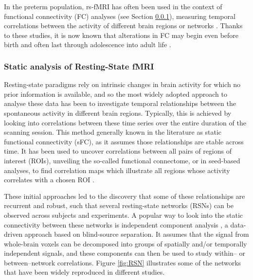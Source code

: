 In the preterm population, rs-fMRI has often been used in the context of functional connectivity (FC) analyses (see Section \ref{sub:static_rsfmri}), measuring temporal correlations between the activity of different brain regions or networks \citep{Lordier2019}. Thanks to these studies, it is now known that alterations in FC may begin even before birth \citep{Thomason2017} and often last through adolescence \citep{Wehrle2018} into adult life \citep{Papini2016}. 

\subsubsection{Static analysis of Resting-State fMRI} \label{sub:static_rsfmri}

Resting-state paradigms rely on intrinsic changes in brain activity for which no prior information is available, and so the most widely adopted approach to analyse these data has been to investigate temporal relationships between the spontaneous activity in different brain regions. Typically, this is achieved by looking into correlations between these time series over the entire duration of the scanning session. This method generally known in the literature as static functional connectivity (sFC), as it assumes those relationships are stable across time. It has been used to uncover correlations between all pairs of regions of interest (ROIs), unveiling the so-called functional connectome, or in seed-based analyses, to find correlation maps which illustrate all regions whose activity correlates with a chosen ROI \citep{Lee2013, Smitha2017}. 

These initial approaches led to the discovery that some of these relationships are recurrent and robust, such that several resting-state networks (RSNs) can be observed across subjects and experiments. A popular way to look into the static connectivity between these networks is independent component analysis \citep{McKeown1998, Calhoun2001}, a data-driven approach based on blind-source separation. It assumes that the signal from whole-brain voxels can be decomposed into groups of spatially and/or temporally independent signals, and these components can then be used to study within– or between–network correlations.   Figure \ref{fig:RSN} illustrates some of the networks that have been widely reproduced in different studies.





